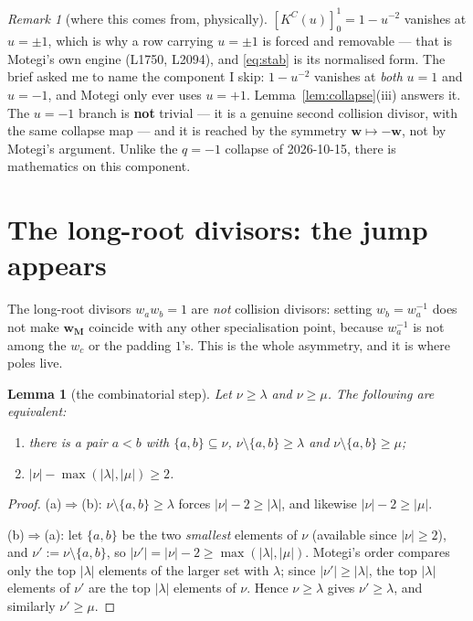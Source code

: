 \documentclass[11pt]{article}
\theoremstyle{plain}
\newtheorem{lem}[thm]{Lemma}
\theoremstyle{definition}
\theoremstyle{remark}
\newtheorem{rem}[thm]{Remark}
\theoremstyle{plain}
\newcommand{\bM}{\mathbf{M}}
\newcommand{\bw}{\mathbf{w}}
\begin{document}
\begin{rem}[where this comes from, physically]
$[K^C(u)]^1_0=1-u^{-2}$ vanishes at $u=\pm1$, which is why a row carrying
$u=\pm1$ is forced and removable --- that is Motegi's own engine (L1750,
L2094), and \eqref{eq:stab} is its normalised form.  The brief asked me to name
the component I skip: $1-u^{-2}$ vanishes at \emph{both} $u=1$ and $u=-1$, and
Motegi only ever uses $u=+1$.  Lemma~\ref{lem:collapse}(iii) answers it.  The
$u=-1$ branch is \textbf{not} trivial --- it is a genuine second collision
divisor, with the same collapse map --- and it is reached by the symmetry
$\bw\mapsto-\bw$, not by Motegi's argument.  Unlike the $q=-1$ collapse of
2026-10-15, there is mathematics on this component.
\end{rem}

\section{The long-root divisors: the jump appears}
\label{sec:long}

The long-root divisors $w_aw_b=1$ are \emph{not} collision divisors: setting
$w_b=w_a^{-1}$ does not make $\bw_{\bM}$ coincide with any other specialisation
point, because $w_a^{-1}$ is not among the $w_c$ or the padding $1$'s.  This is
the whole asymmetry, and it is where poles live.

\begin{lem}[the combinatorial step]\label{lem:comb}
Let $\nu\ge\lambda$ and $\nu\ge\mu$.  The following are equivalent:
\begin{enumerate}
\item[(a)] there is a pair $a<b$ with $\{a,b\}\subseteq\nu$,
$\nu\setminus\{a,b\}\ge\lambda$ and $\nu\setminus\{a,b\}\ge\mu$;
\item[(b)] $|\nu|-\max(|\lambda|,|\mu|)\ge2$.
\end{enumerate}
\end{lem}
\begin{proof}
(a)$\Rightarrow$(b): $\nu\setminus\{a,b\}\ge\lambda$ forces
$|\nu|-2\ge|\lambda|$, and likewise $|\nu|-2\ge|\mu|$.

(b)$\Rightarrow$(a): let $\{a,b\}$ be the two \emph{smallest} elements of
$\nu$ (available since $|\nu|\ge2$), and $\nu':=\nu\setminus\{a,b\}$, so
$|\nu'|=|\nu|-2\ge\max(|\lambda|,|\mu|)$.  Motegi's order compares only the
top $|\lambda|$ elements of the larger set with $\lambda$; since
$|\nu'|\ge|\lambda|$, the top $|\lambda|$ elements of $\nu'$ are the top
$|\lambda|$ elements of $\nu$.  Hence $\nu\ge\lambda$ gives $\nu'\ge\lambda$,
and similarly $\nu'\ge\mu$.
\end{proof}
\end{document}
